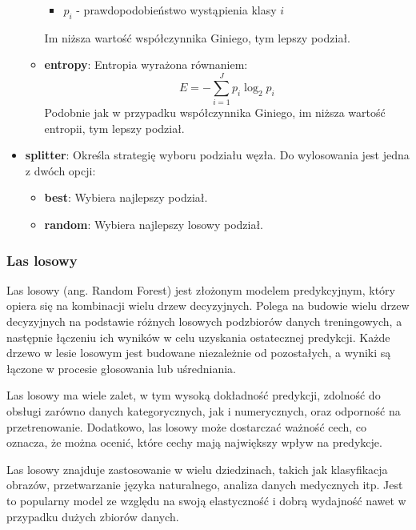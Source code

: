 \documentclass{article}
\begin{document}
\begin{itemize}
\begin{itemize}
\begin{itemize}
            \item $p_i$ - prawdopodobieństwo wystąpienia klasy $i$
        \end{itemize}
        Im niższa wartość współczynnika Giniego, tym lepszy podział.
        \item \textbf{entropy}: Entropia wyrażona równaniem:
        \begin{equation}
            E = -\sum_{i=1}^{J}p_i\log_2{p_i}
        \end{equation}
        Podobnie jak w przypadku współczynnika Giniego, im niższa
        wartość entropii, tym lepszy podział.
    \end{itemize}
    \item \textbf{splitter}: Określa strategię
    wyboru podziału węzła. Do wylosowania jest
    jedna z dwóch opcji:
    \begin{itemize}
        \item \textbf{best}: Wybiera najlepszy podział.
        \item \textbf{random}: Wybiera najlepszy losowy podział.
    \end{itemize}

\end{itemize}

\subsubsection{Las losowy}
Las losowy (ang. Random Forest) jest złożonym modelem 
predykcyjnym, który opiera się na kombinacji wielu drzew decyzyjnych. 
Polega na budowie wielu drzew decyzyjnych na podstawie 
różnych losowych podzbiorów danych treningowych, a 
następnie łączeniu ich wyników w celu uzyskania ostatecznej 
predykcji. Każde drzewo w lesie losowym jest budowane 
niezależnie od pozostałych, a wyniki są łączone w procesie 
głosowania lub uśredniania.

Las losowy ma wiele zalet, w tym wysoką dokładność 
predykcji, zdolność do obsługi zarówno danych 
kategorycznych, jak i numerycznych, oraz odporność 
na przetrenowanie. Dodatkowo, las losowy może dostarczać 
ważność cech, co oznacza, że można ocenić, które cechy 
mają największy wpływ na predykcje.

Las losowy znajduje zastosowanie w wielu dziedzinach, 
takich jak klasyfikacja obrazów, przetwarzanie 
języka naturalnego, analiza danych medycznych itp. 
Jest to popularny model ze względu na swoją elastyczność 
i dobrą wydajność nawet w przypadku dużych zbiorów danych.
\end{document}
